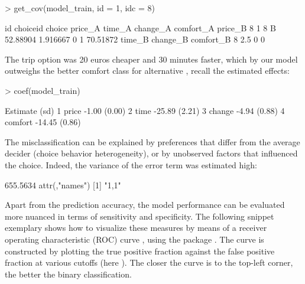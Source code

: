 \documentclass[article]{jss}
\begin{document}
\begin{Schunk}
\begin{Sinput}
> get_cov(model_train, id = 1, idc = 8)
\end{Sinput}
\begin{Soutput}
  id choiceid choice  price_A   time_A change_A comfort_A  price_B
8  1        8      B 52.88904 1.916667        0         1 70.51872
  time_B change_B comfort_B
8    2.5        0         0
\end{Soutput}
\end{Schunk}

The trip option  was 20 euros cheaper and 30 minutes faster, which by our model outweighs the better comfort class for alternative , recall the estimated effects:

\begin{Schunk}
\begin{Sinput}
> coef(model_train)
\end{Sinput}
\begin{Soutput}
           Estimate   (sd)
1   price     -1.00 (0.00)
2    time    -25.89 (2.21)
3  change     -4.94 (0.88)
4 comfort    -14.45 (0.86)
\end{Soutput}
\end{Schunk}

The misclassification can be explained by preferences that differ from the average decider (choice behavior heterogeneity), or by unobserved factors that influenced the choice. Indeed, the variance of the error term was estimated high:

\begin{Schunk}
\begin{Soutput}
         [,1]
[1,] 655.5634
attr(,"names")
[1] "1,1"
\end{Soutput}
\end{Schunk}

Apart from the prediction accuracy, the model performance can be evaluated more nuanced in terms of sensitivity and specificity. The following snippet exemplary shows how to visualize these measures by means of a receiver operating characteristic (ROC) curve \citep{Fawcett:2006}, using the  package \citep{Sachs:2017}. The curve is constructed by plotting the true positive fraction against the false positive fraction at various cutoffs (here ). The closer the curve is to the top-left corner, the better the binary classification.
\end{document}
